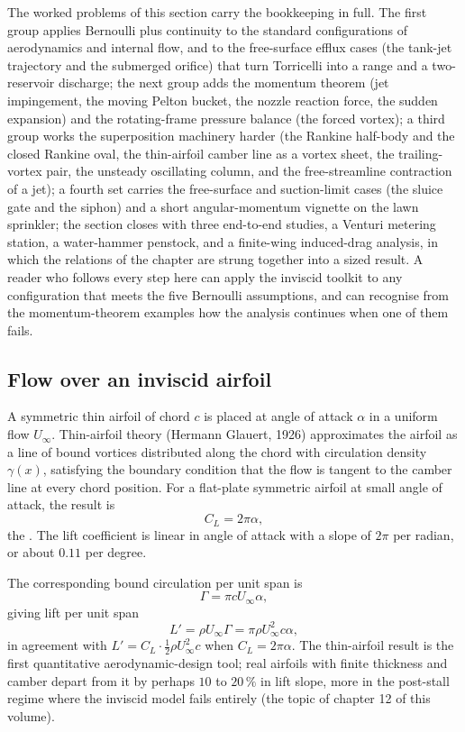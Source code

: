 The worked problems of this section carry the bookkeeping in full. The
first group applies Bernoulli plus continuity to the standard
configurations of aerodynamics and internal flow, and to the
free-surface efflux cases (the tank-jet trajectory and the submerged
orifice) that turn Torricelli into a range and a two-reservoir
discharge; the next group adds the momentum theorem (jet impingement,
the moving Pelton bucket, the nozzle reaction force, the sudden
expansion) and the rotating-frame pressure balance (the forced vortex);
a third group works the superposition machinery harder (the Rankine
half-body and the closed Rankine oval, the thin-airfoil camber line as a
vortex sheet, the trailing-vortex pair, the unsteady oscillating column,
and the free-streamline contraction of a jet); a fourth set carries the
free-surface and suction-limit cases (the sluice gate and the siphon)
and a short angular-momentum vignette on the lawn sprinkler; the section
closes with three end-to-end studies, a Venturi metering station, a
water-hammer penstock, and a finite-wing induced-drag analysis, in which
the relations of the chapter are strung together into a sized result. A
reader who follows every step here can apply the inviscid toolkit to any
configuration that meets the five Bernoulli assumptions, and can
recognise from the momentum-theorem examples how the analysis continues
when one of them fails.

\subsection{Flow over an inviscid airfoil}

A symmetric thin airfoil of chord $c$ is placed at angle of attack
$\alpha$ in a uniform flow $U_\infty$. Thin-airfoil theory (Hermann
Glauert, 1926) approximates the airfoil as a line of bound vortices
distributed along the chord with circulation density $\gamma(x)$,
satisfying the boundary condition that the flow is tangent to the
camber line at every chord position. For a flat-plate symmetric
airfoil at small angle of attack, the result is
\[
C_L = 2\pi\alpha,
\]
the . The lift coefficient is
linear in angle of attack with a slope of $2\pi$ per radian, or
about $0.11$ per degree.

The corresponding bound circulation per unit span is
\[
\Gamma = \pi c U_\infty \alpha,
\]
giving lift per unit span
\[
L' = \rho U_\infty \Gamma = \pi \rho U_\infty^2 c \alpha,
\]
in agreement with $L' = C_L \cdot \tfrac{1}{2}\rho U_\infty^2 c$
when $C_L = 2\pi\alpha$. The thin-airfoil result is the first
quantitative aerodynamic-design tool; real airfoils with finite
thickness and camber depart from it by perhaps $10$ to $20\,\%$ in
lift slope, more in the post-stall regime where the inviscid model
fails entirely (the topic of chapter 12 of this volume).

